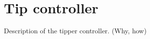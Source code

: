 \section{Tip controller} %
\label{sec:mr_tip_controller}

Description of the tipper controller. (Why, how)

